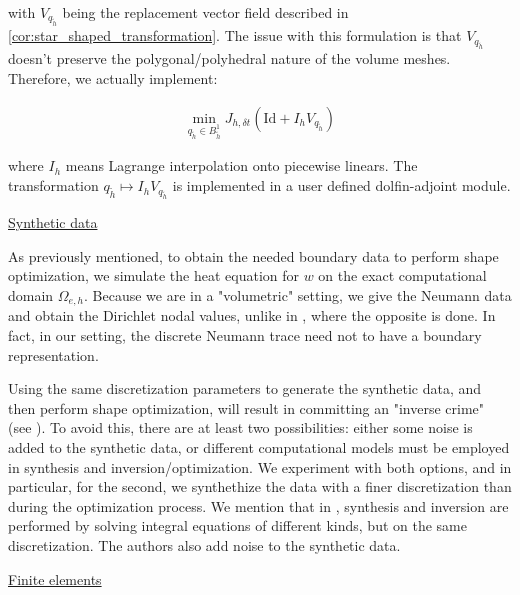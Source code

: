 \documentclass[english,a4paper,9pt,oneside]{scrbook}	%
\theoremstyle{break}
\theoremstyle{remark}
\newcommand{\id}{\text{Id}}
\begin{document}
with $V_{q_{\tilde{h}}}$ being the replacement vector field described in  \cref{cor:star_shaped_transformation}. The issue with this formulation is that  $V_{q_{\tilde{h}}}$ doesn't preserve the polygonal/polyhedral nature of the volume meshes. Therefore, we actually implement:

\begin{align*}
	\min_{q_{\tilde{h}} \in B^1_{\tilde{h}}}J_{h,\delta t }(\id  + I_h V_{q_{\tilde{h}}})
\end{align*}

where $I_h$ means Lagrange interpolation onto piecewise linears. The transformation $q_{\tilde{h}} \mapsto I_h V_{q_{\tilde{h}}}$ is implemented in a user defined dolfin-adjoint module.

\underline{Synthetic data}

As previously mentioned, to obtain the needed boundary data to perform shape optimization, we simulate the heat equation for $w$ on the exact computational domain $\Omega_{e,h}$. Because we are in a "volumetric" setting, we give the Neumann data and obtain the Dirichlet nodal values, unlike in \cite{harbrecht}, where the opposite is done. In fact, in our setting, the discrete Neumann trace need not to have a boundary representation.

Using the same discretization parameters to generate the synthetic data, and then perform shape optimization, will result in committing an "inverse crime" (see \cite{wirgin}). To avoid this, there are at least two possibilities: either some noise is added to the synthetic data, or different computational models must be employed in synthesis and inversion/optimization. We experiment with both options, and in particular, for the second, we synthethize the data with a finer discretization than during the optimization process. We mention that in \cite{harbrecht}, synthesis and inversion are performed by solving integral equations of different kinds, but on the same discretization. The authors also add noise to the synthetic data.  

\underline{Finite elements}
\end{document}

